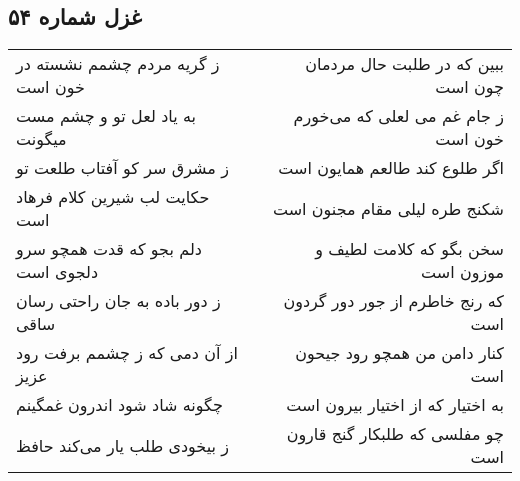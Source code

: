 \begin{center}
\section*{غزل شماره ۵۴}
\label{sec:sh054}
\begin{longtable}{l p{0.5cm} r}
ز گریه مردم چشمم نشسته در خون است
&&
ببین که در طلبت حال مردمان چون است
\\
به یاد لعل تو و چشم مست میگونت
&&
ز جام غم می لعلی که می‌خورم خون است
\\
ز مشرق سر کو آفتاب طلعت تو
&&
اگر طلوع کند طالعم همایون است
\\
حکایت لب شیرین کلام فرهاد است
&&
شکنج طره لیلی مقام مجنون است
\\
دلم بجو که قدت همچو سرو دلجوی است
&&
سخن بگو که کلامت لطیف و موزون است
\\
ز دور باده به جان راحتی رسان ساقی
&&
که رنج خاطرم از جور دور گردون است
\\
از آن دمی که ز چشمم برفت رود عزیز
&&
کنار دامن من همچو رود جیحون است
\\
چگونه شاد شود اندرون غمگینم
&&
به اختیار که از اختیار بیرون است
\\
ز بیخودی طلب یار می‌کند حافظ
&&
چو مفلسی که طلبکار گنج قارون است
\\
\end{longtable}
\end{center}

